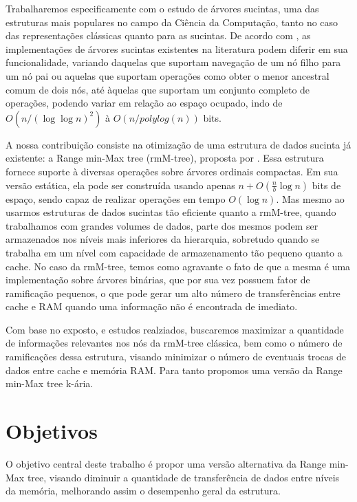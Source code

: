Trabalharemos especificamente com o estudo de árvores sucintas, uma das estruturas mais populares no campo da Ciência da Computação, tanto no caso das representações clássicas quanto para as sucintas. De acordo com \citet{paper-succint-trees-in-practice}, as implementações de árvores sucintas existentes na literatura podem diferir em sua funcionalidade, variando daquelas que suportam navegação de um nó filho para um nó pai ou aquelas que suportam operações como obter o menor ancestral
comum de dois nós, até àquelas que suportam um conjunto completo de operações, podendo variar em relação ao espaço ocupado, indo  de $O(n/(\log \log n)^2)$ à $O(n/ polylog(n))$ bits.

A nossa contribuição consiste na otimização de uma estrutura de dados sucinta já existente: a Range min-Max tree (rmM-tree), proposta por \cite{paper-fully-functinal-succint-trees}. Essa estrutura fornece suporte à diversas operações sobre árvores ordinais compactas. Em sua versão estática, ela pode ser construída usando apenas $n + O(\frac{n}{b} \log n)$ bits de espaço, sendo capaz de realizar operações em tempo $O(\log n)$\citep{paper-fully-functinal-succint-trees}.
Mas mesmo ao usarmos estruturas de dados sucintas tão eficiente quanto a rmM-tree, quando trabalhamos com grandes volumes de dados, parte dos mesmos podem ser armazenados nos níveis mais inferiores da hierarquia, sobretudo quando se trabalha em um nível com capacidade de armazenamento tão pequeno quanto a cache. 
No caso da rmM-tree, temos como agravante o fato de que a mesma é uma implementação sobre árvores binárias, que por sua vez possuem fator de ramificação pequenos, o que pode gerar um alto número de transferências entre cache e RAM quando uma informação não é encontrada de imediato.

Com base no exposto, e estudos realziados, buscaremos maximizar a quantidade de informações relevantes nos nós da rmM-tree clássica, bem como o número de ramificações dessa estrutura, visando minimizar o número de eventuais trocas de dados entre cache e memória RAM.
Para tanto propomos uma versão da Range min-Max tree k-ária.

\section{Objetivos}
O objetivo central deste trabalho é propor uma versão alternativa da Range min-Max tree, visando diminuir a quantidade de transferência de dados entre níveis da memória,
melhorando assim o desempenho geral da estrutura. 

